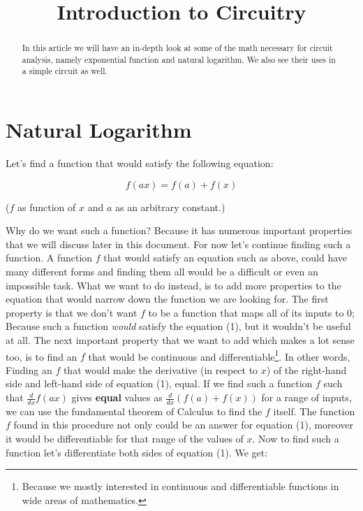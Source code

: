 \documentclass{article}
\begin{document}
	
	\title{Introduction to Circuitry}
	\author{}
	
	\maketitle
	
	\begin{abstract}
	In this article we will have an in-depth look at some of the math  necessary for circuit analysis, namely exponential function and natural logarithm. We also see their uses in a simple circuit as well.
	\end{abstract}
	
	\section{Natural Logarithm}
	Let's find a function that would satisfy the following equation:
	
	\begin{equation}
	\label{simple_equation}
	f(ax) = f(a) + f(x)
	\end{equation}
	
	($f$ as function of $x$ and $a$ as an arbitrary constant.)
	
	
	Why do we want such a function? Because it has numerous important properties that we will discuss later in this document.
	For now let's continue finding such a function. A function $f$ that would satisfy an equation such as above, could have many different forms and finding them all would be a difficult or even an impossible task. What we want to do instead, is to add more properties to the equation that would narrow down the function we are looking for. The first property is that we don't want $f$ to be a function that maps all of its inputs to $0$; Because such a function \textit{would} satisfy the equation (1), but it wouldn't be useful at all. The next important property that we want to add which makes a lot sense too, is to find an $f$ that would be continuous and differentiable\footnote[1]{Because we mostly interested in continuous and differentiable functions in wide areas of mathematics.}. In other words, Finding an $f$ that would make the derivative (in respect to $x$) of the right-hand side and left-hand side of equation (1), equal. If we find such a function $f$ such that $\frac{d}{dx}f(ax)$ gives \textbf{equal} values as $\frac{d}{dx}(f(a) + f(x))$ for a range of inputs, we can use the fundamental theorem of Calculus to find the $f$ itself. The function $f$ found in this procedure not only could be an answer for equation (1), moreover it would be differentiable for that range of the values of $x$.	
	Now to find such a function let's differentiate both sides of equation (1). We get:
	
\end{document}
